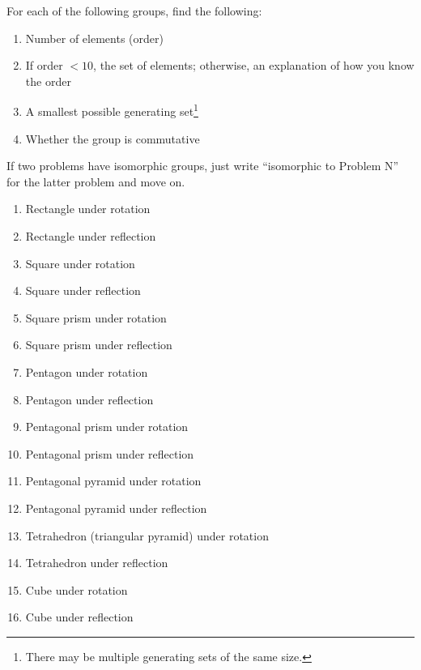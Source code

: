 \documentclass[../gatm.tex]{subfiles}
\begin{document}
For each of the following groups, find the following:

\begin{enumerate}[label=(\alph*)]
\item Number of elements (order)
\item If order $< 10$, the set of elements; otherwise, an explanation of how you know the order
\item A smallest possible generating set\footnote{There may be multiple generating sets of the same size.}
\item Whether the group is commutative
\end{enumerate}

If two problems have isomorphic groups, just write ``isomorphic to Problem N'' for the latter problem and move on.

\begin{multicols}{2}
\begin{enumerate}
\setcounter{enumi}{\value{rrg_problem_i}}
\item Rectangle under rotation
\item Rectangle under reflection
\item Square under rotation
\item Square under reflection
\item Square prism under rotation
\item Square prism under reflection
\item Pentagon under rotation
\item Pentagon under reflection
\item Pentagonal prism under rotation
\item Pentagonal prism under reflection
\item Pentagonal pyramid under rotation
\item Pentagonal pyramid under reflection
\item Tetrahedron (triangular pyramid) under rotation
\item Tetrahedron under reflection
\item Cube under rotation
\item Cube under reflection
\end{enumerate}
\end{multicols}
\end{document}
